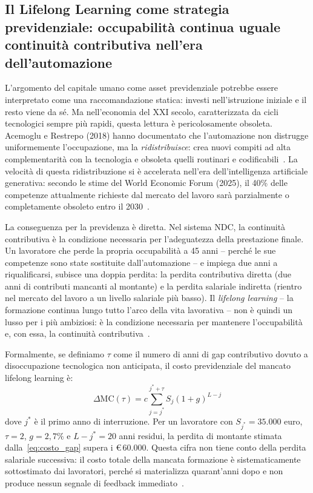 \subsection{Il Lifelong Learning come strategia previdenziale:
            occupabilità continua uguale continuità contributiva
            nell'era dell'automazione}
\label{subsec:lifelong_learning}

L'argomento del capitale umano come asset previdenziale potrebbe essere
interpretato come una raccomandazione statica: investi nell'istruzione
iniziale e il resto viene da sé. Ma nell'economia del XXI secolo,
caratterizzata da cicli tecnologici sempre più rapidi, questa lettura è
pericolosamente obsoleta. Acemoglu e Restrepo (2018) hanno documentato
che l'automazione non distrugge uniformemente l'occupazione, ma la
\emph{ridistribuisce}: crea nuovi compiti ad alta complementarità con la
tecnologia e obsoleta quelli routinari e codificabili~\cite{AcemogluRestrepo2018}.
La velocità di questa ridistribuzione si è accelerata nell'era dell'intelligenza
artificiale generativa: secondo le stime del World Economic Forum (2025),
il 40\% delle competenze attualmente richieste dal mercato del lavoro sarà
parzialmente o completamente obsoleto entro il 2030~\cite{WEF2025}.

La conseguenza per la previdenza è diretta. Nel sistema NDC, la continuità
contributiva è la condizione necessaria per l'adeguatezza della prestazione
finale. Un lavoratore che perde la propria occupabilità a 45 anni -- perché
le sue competenze sono state sostituite dall'automazione -- e impiega due
anni a riqualificarsi, subisce una doppia perdita: la perdita contributiva
diretta (due anni di contributi mancanti al montante) e la perdita salariale
indiretta (rientro nel mercato del lavoro a un livello salariale più basso).
Il \emph{lifelong learning} -- la formazione continua lungo tutto l'arco della
vita lavorativa -- non è quindi un lusso per i più ambiziosi: è la condizione
necessaria per mantenere l'occupabilità e, con essa, la continuità
contributiva~\cite{Bosi2018, Raitano2022}.

Formalmente, se definiamo \(\tau\) come il numero di anni di gap contributivo
dovuto a disoccupazione tecnologica non anticipata, il costo previdenziale
del mancato lifelong learning è:
%
\begin{equation}
  \Delta \mathrm{MC}(\tau) =
  c \sum_{j=j^*}^{j^*+\tau} S_j (1+g)^{L-j}
  \label{eq:costo_gap}
\end{equation}
%
dove \(j^*\) è il primo anno di interruzione. Per un lavoratore con
\(S_{j^*} = 35.000\) euro, \(\tau = 2\), \(g = 2{,}7\%\) e
\(L - j^* = 20\) anni residui, la perdita di montante
stimata dalla~\eqref{eq:costo_gap} supera i \euro\,60.000. Questa cifra
non tiene conto della perdita salariale successiva: il costo totale della
mancata formazione è sistematicamente sottostimato dai lavoratori, perché
si materializza quarant'anni dopo e non produce nessun segnale di feedback
immediato~\cite{ThalerSunstein2008}.

